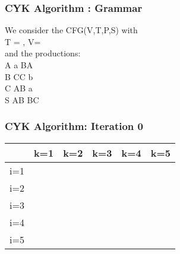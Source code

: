 \documentclass{beamer}
\DeclarePairedDelimiter\set\{\}
\begin{document}
            
                    \begin{frame}
                    \frametitle{CYK Algorithm : Grammar}
                    \begin{center}
                        We consider the CFG(V,T,P,S) with \\ T = , V= \\ and the productions: \\
                            A \Rightarrow a \mid BA\\
                            B \Rightarrow CC \mid b\\
                            C \Rightarrow AB \mid a\\
                            S \Rightarrow AB \mid BC\\
                            
                    \end{center}
                    \end{frame}
                
            \begin{frame}
            \frametitle{CYK Algorithm: Iteration 0}
                \begin{center}
                    
                    \begin{tabular}{c|c|c|c|c|c|}
                     & k=1 & k=2 & k=3 & k=4 & k=5 \\
                    \hline
                    i=1 &   &   &   &   &   \\
                    \hline
                    i=2 &   &   &   &   &   \\
                    \hline
                    i=3 &   &   &   &   &   \\
                    \hline
                    i=4 &   &   &   &   &   \\
                    \hline
                    i=5 &   &   &   &   &   \\
                    \hline
                    
                    \end{tabular}
                
                \end{center}
            \end{frame}
        
\end{document}
